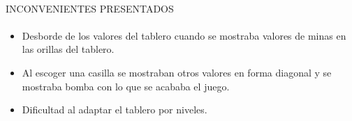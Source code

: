 \documentclass[../documentacion_buscaminas2013.tex]{subfiles}
\begin{document}
\paragraph{ }INCONVENIENTES PRESENTADOS

\paragraph{ }
\begin{itemize}
 \item Desborde de los valores del tablero cuando se mostraba valores de minas en las orillas del tablero.
 \item Al escoger una casilla se mostraban otros valores en forma diagonal y se mostraba bomba con lo que se acababa el juego.
 \item Dificultad al adaptar el tablero por niveles.

\end{itemize}



\clearpage
\end{document}
